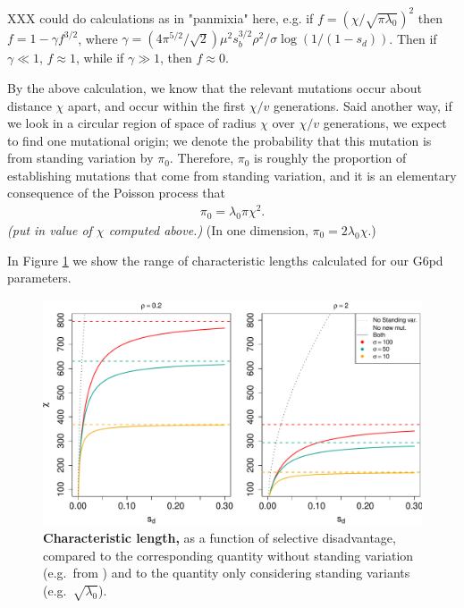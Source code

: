 \documentclass{article}
\newcommand{\marginnote}[1]{{\it\color{red}(#1)}}
\begin{document}
XXX could do calculations as in "panmixia" here, e.g. if $f = (\chi/\sqrt{\pi \lambda_0})^2$ then
$f = 1-\gamma f^{3/2}$, where
$\gamma = (4 \pi^{5/2} / \sqrt{2}) \mu^2 s_b^{3/2} \rho^2 / \sigma \log(1/(1-s_d))$.
Then if $\gamma \ll 1$, $f \approx 1$, while if $\gamma \gg 1$, then $f \approx 0$.

By the above calculation, we know that the relevant mutations occur about distance $\chi$ apart, 
and occur within the first $\chi/v$ generations.
Said another way, if we look in a circular region of space of radius $\chi$ over $\chi/v$ generations,
we expect to find one mutational origin;
we denote the probability that this mutation is from standing variation by $\pi_0$.
Therefore, $\pi_0$ is roughly the proportion of establishing mutations that come from standing variation,
and it is an elementary consequence of the Poisson process that
\begin{align} \label{eqn:pizero}
    \pi_0 = \lambda_0 \pi \chi^2 .
\end{align}
\marginnote{put in value of $\chi$ computed above.}
(In one dimension, $\pi_0 = 2 \lambda_0 \chi$.)

In Figure \ref{Fig-G6PD-charlength} we show the range of characteristic lengths
calculated for our G6pd parameters.


\begin{figure}[ht]
\begin{center}
  \includegraphics[width=1.0\textwidth]{G6PD_charlengths}   %
\caption{ %
{\bf Characteristic length,} as a function of selective disadvantage, compared to the corresponding quantity without standing variation (e.g.\ from \cite{ralphcoop2010}) and to the quantity only considering standing variants (e.g.\ $\sqrt{\lambda_0}$).
} \label{Fig-G6PD-charlength}
\end{center}
\end{figure}
\end{document}
